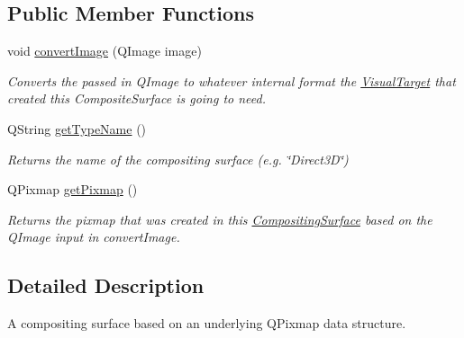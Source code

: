 \subsection*{Public Member Functions}
\begin{DoxyCompactItemize}
\item 
\hypertarget{class_picto_1_1_pixmap_compositing_surface_a17c6bdff2b7b241f7ae16ae4dc65a94a}{void \hyperlink{class_picto_1_1_pixmap_compositing_surface_a17c6bdff2b7b241f7ae16ae4dc65a94a}{convert\-Image} (Q\-Image image)}\label{class_picto_1_1_pixmap_compositing_surface_a17c6bdff2b7b241f7ae16ae4dc65a94a}

\begin{DoxyCompactList}\small\item\em Converts the passed in Q\-Image to whatever internal format the \hyperlink{class_picto_1_1_visual_target}{Visual\-Target} that created this Composite\-Surface is going to need. \end{DoxyCompactList}\item 
\hypertarget{class_picto_1_1_pixmap_compositing_surface_a7dcc99475758356b34d8bd29d131e138}{Q\-String \hyperlink{class_picto_1_1_pixmap_compositing_surface_a7dcc99475758356b34d8bd29d131e138}{get\-Type\-Name} ()}\label{class_picto_1_1_pixmap_compositing_surface_a7dcc99475758356b34d8bd29d131e138}

\begin{DoxyCompactList}\small\item\em Returns the name of the compositing surface (e.\-g. \char`\"{}\-Direct3\-D\char`\"{}) \end{DoxyCompactList}\item 
\hypertarget{class_picto_1_1_pixmap_compositing_surface_a18cfc332c82987d3143ec2d71ad60932}{Q\-Pixmap \hyperlink{class_picto_1_1_pixmap_compositing_surface_a18cfc332c82987d3143ec2d71ad60932}{get\-Pixmap} ()}\label{class_picto_1_1_pixmap_compositing_surface_a18cfc332c82987d3143ec2d71ad60932}

\begin{DoxyCompactList}\small\item\em Returns the pixmap that was created in this \hyperlink{struct_picto_1_1_compositing_surface}{Compositing\-Surface} based on the Q\-Image input in convert\-Image. \end{DoxyCompactList}\end{DoxyCompactItemize}


\subsection{Detailed Description}
A compositing surface based on an underlying Q\-Pixmap data structure. 

